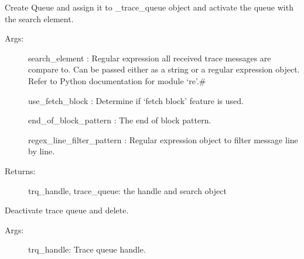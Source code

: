\documentclass[letterpaper,10pt,english]{sphinxmanual}
\begin{document}
\begin{fulllineitems}
\begin{fulllineitems}
\label{\detokenize{QConnectBase:QConnectBase.connection_base.ConnectionBase.create_and_activate_trace_queue}}
\sphinxAtStartPar
Create Queue and assign it to \_trace\_queue object and activate the queue with the search element.
\begin{description}
\item[{Args:}] \leavevmode
\sphinxAtStartPar
search\_element :  Regular expression all received trace messages are compare to.                Can be passed either as a string or a regular expression object. Refer to Python documentation for module ‘re’.\#

\sphinxAtStartPar
use\_fetch\_block : Determine if ‘fetch block’ feature is used.

\sphinxAtStartPar
end\_of\_block\_pattern : The end of block pattern.

\sphinxAtStartPar
regex\_line\_filter\_pattern : Regular expression object to filter message line by line.

\item[{Returns:}] \leavevmode
\sphinxAtStartPar
trq\_handle, trace\_queue: the handle and search object

\end{description}

\end{fulllineitems}


\begin{fulllineitems}
\label{\detokenize{QConnectBase:QConnectBase.connection_base.ConnectionBase.deactivate_and_delete_trace_queue}}
\sphinxAtStartPar
Deactivate trace queue and delete.
\begin{description}
\item[{Args:}] \leavevmode
\sphinxAtStartPar
trq\_handle: Trace queue handle.


\end{description}
\end{fulllineitems}
\end{fulllineitems}
\end{document}
